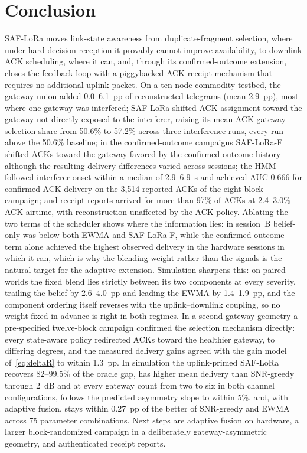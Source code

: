\documentclass[journal]{IEEEtran}
\begin{document}
\section{Conclusion}
SAF-LoRa moves link-state awareness from duplicate-fragment selection, where under hard-decision reception it provably cannot improve availability, to downlink ACK scheduling, where it can, and, through its confirmed-outcome extension, closes the feedback loop with a piggybacked ACK-receipt mechanism that requires no additional uplink packet. On a ten-node commodity testbed, the gateway union added 0.0--6.1~pp of reconstructed telegrams (mean 2.9~pp), most where one gateway was interfered; SAF-LoRa shifted ACK assignment toward the gateway not directly exposed to the interferer, raising its mean ACK gateway-selection share from 50.6\% to 57.2\% across three interference runs, every run above the 50.6\% baseline; in the confirmed-outcome campaigns SAF-LoRa-F shifted ACKs toward the gateway favored by the confirmed-outcome history although the resulting delivery differences varied across sessions; the HMM followed interferer onset within a median of 2.9--6.9~s and achieved AUC 0.666 for confirmed ACK delivery on the 3{,}514 reported ACKs of the eight-block campaign; and receipt reports arrived for more than 97\% of ACKs at 2.4--3.0\% ACK airtime, with reconstruction unaffected by the ACK policy. Ablating the two terms of the scheduler shows where the information lies: in session~B belief-only was below both EWMA and SAF-LoRa-F, while the confirmed-outcome term alone achieved the highest observed delivery in the hardware sessions in which it ran, which is why the blending weight rather than the signals is the natural target for the adaptive extension. Simulation sharpens this: on paired worlds the fixed blend lies strictly between its two components at every severity, trailing the belief by 2.6--4.0~pp and leading the EWMA by 1.4--1.9~pp, and the component ordering itself reverses with the uplink--downlink coupling, so no weight fixed in advance is right in both regimes. In a second gateway geometry a pre-specified twelve-block campaign confirmed the selection mechanism directly: every state-aware policy redirected ACKs toward the healthier gateway, to differing degrees, and the measured delivery gains agreed with the gain model of~\eqref{eq:deltaR} to within 1.3~pp. In simulation the uplink-primed SAF-LoRa recovers 82--99.5\% of the oracle gap, has higher mean delivery than SNR-greedy through 2~dB and at every gateway count from two to six in both channel configurations, follows the predicted asymmetry slope to within 5\%, and, with adaptive fusion, stays within 0.27~pp of the better of SNR-greedy and EWMA across 75 parameter combinations. Next steps are adaptive fusion on hardware, a larger block-randomized campaign in a deliberately gateway-asymmetric geometry, and authenticated receipt reports.
\end{document}
